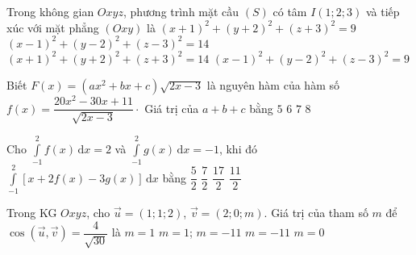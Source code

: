 \begin{ex}%
Trong không gian $O x y z$, phương trình mặt cầu $(S)$ có tâm $I(1 ; 2 ; 3)$ và tiếp xúc với mặt phẳng $(Oxy)$ là
\choice
{$(x+1)^{2}+(y+2)^{2}+(z+3)^{2}=9$}
{$(x-1)^{2}+(y-2)^{2}+(z-3)^{2}=14$}
{$(x+1)^{2}+(y+2)^{2}+(z+3)^{2}=14$}
{\True $(x-1)^{2}+(y-2)^{2}+(z-3)^{2}=9$}
\end{ex}

\begin{ex}%
Biết $F(x)=(a x^2+b x+c) \sqrt{2x-3}$ là nguyên hàm của hàm số $f(x)=\dfrac{20 x^2-30 x+11}{\sqrt{2x-3}} \cdot$ Giá trị của $a+b+c$ bằng
\choice
{$5$}
{$6$}
{\True $7$}
{$8$}
\end{ex}

\begin{ex}%
Cho $ \displaystyle \int\limits_{-1}^2 f(x) \mathrm{\,d}x=2 $ và $ \displaystyle \int\limits_{-1}^2 g(x) \mathrm{\,d}x=-1 $, khi đó $ \displaystyle \int\limits_{-1}^2 \left[x+2f(x)-3g(x)\right] \mathrm{\,d}x $ bằng
\choice
{$ \dfrac{5}{2} $}
{$ \dfrac{7}{2} $}
{\True $ \dfrac{17}{2} $}
{$ \dfrac{11}{2} $}
\end{ex}

\begin{ex}%
Trong KG $Oxyz$, cho $\vec{u} =(1;1;2)$, $\vec{v} =(2;0;m)$. Giá trị của tham số $m$ để $\cos \left(\vec{u}, \vec{v} \right)= \dfrac{4}{\sqrt{30}}$ là \choice
{\True $m=1 $}
{$m=1 $; $m=-11$}
{$ m=-11 $}
{$m=0$}
\end{ex}

